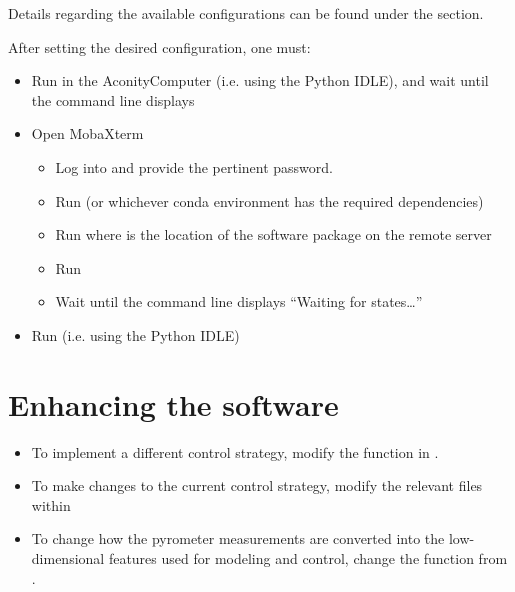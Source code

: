 \documentclass[letterpaper,10pt,english,openany,oneside]{sphinxmanual}
\begin{document}
Details regarding the available configurations can be found under the  section.

After setting the desired configuration, one must:
\begin{itemize}
\item {} 
Run  in the AconityComputer (i.e. using the Python IDLE), and wait until the command line displays 

\item {} 
Open MobaXterm
\begin{itemize}
\item {} 
Log into  and provide the pertinent password.

\item {} 
Run  (or whichever conda environment has the required dependencies)

\item {} 
Run  where  is the location of the software package on the remote server

\item {} 
Run 

\item {} 
Wait until the command line displays “Waiting for states…”

\end{itemize}

\item {} 
Run  (i.e. using the Python IDLE)

\end{itemize}


\section{Enhancing the software}
\label{\detokenize{installation:enhancing-the-software}}\begin{itemize}
\item {} 
To implement a different control strategy, modify the function  in .

\item {} 
To make changes to the current control strategy, modify the relevant files within 

\item {} 
To change how the pyrometer measurements are converted into the low-dimensional features used for modeling and control, change the function  from .

\end{itemize}
\end{document}
